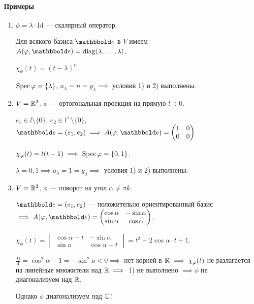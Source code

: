 \paragraph{Примеры}

\begin{enumerate}
    \item $\phi = \lambda \cdot \mathrm{Id}$ --- скалярный оператор.

        Для всякого базиса $\E$ в $V$ имеем $A(\phi, \E) = \diag(\lambda, \dots, \lambda)$.

        $\chi_\phi(t) = (t - \lambda)^n$.

        $\operatorname{\mathop{\mathrm{Spec}}} \varphi = \{\lambda\}$, $a_\lambda = n = g_\lambda \implies $ условия 1) и 2) выполнены.

    \item $V = \mathbb{R}^2$, $\phi$ --- ортогональная проекция на прямую $l \ni 0$.

        $e_1 \in l \setminus \{0\}$, $e_2 \in l^{\perp} \setminus \{0\}$, $\E = (e_1, e_2) \implies A(\phi, \E) = \begin{pmatrix} 1 & 0 \\ 0 & 0 \end{pmatrix}$

        $\chi_\varphi(t) = t(t - 1) \implies \operatorname{\mathop{\mathrm{Spec}}} \varphi = \{0, 1\}$.

        $\lambda = 0, 1 \implies a_\lambda = 1 = g_\lambda \implies $ условия 1) и 2) выполнены.

    \item $V = \mathbb{R}^2$, $\phi$ --- поворот на угол $\alpha \neq \pi k$.

        $\E = (e_1, e_2)$ --- положительно ориентированный базис $\implies A(\phi, \E) = \begin{pmatrix} \cos \alpha & - \sin \alpha \\ \sin \alpha & \cos \alpha \end{pmatrix}$.

        $\chi_\phi(t) = \begin{vmatrix} \cos \alpha - t & - \sin \alpha \\ \sin a & \cos \alpha - t \end{vmatrix} = t^2 - 2 \cos \alpha \cdot t + 1$.

        $\frac{D}{4} = \cos ^2 \alpha - 1 = - \sin ^2 a < 0 \implies $ нет корней в $\mathbb{R} \implies \chi_\varphi(t)$ не разлагается на линейные множители над $\mathbb{R} \implies $ 1) не выполнено $ \implies \phi$ не диагонализуем над $\mathbb{R}$.

        Однако $\phi$ диагонализуем над $\mathbb{C}$!


\end{enumerate}
